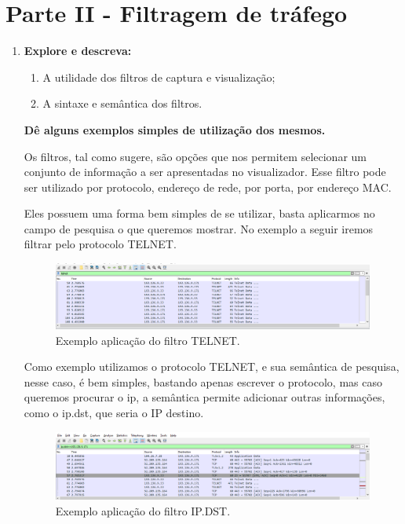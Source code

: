 \documentclass{llncs}
\begin{document}
  \section{Parte II - Filtragem de tráfego}

  \begin{enumerate}[\textbf{a)}]
    \item \textbf{Explore e descreva:}
    \begin{enumerate}[i]
      \item A utilidade dos filtros de captura e visualização;    
      \item A sintaxe e semântica dos filtros.
    \end{enumerate}
    \par\textbf{Dê alguns exemplos simples de utilização dos mesmos.}
    
    \begin{flushleft}
      \par Os filtros, tal como sugere, são opções que nos permitem selecionar um conjunto de informação a ser apresentadas no visualizador. Esse filtro pode ser utilizado por protocolo, endereço de rede, por porta, por endereço MAC.
      \par Eles possuem uma forma bem simples de se utilizar, basta aplicarmos no campo de pesquisa o que queremos mostrar. No exemplo a seguir iremos filtrar pelo protocolo TELNET.
      \begin{figure}[h]
        \includegraphics[scale=0.3]{filter01.png}
        \centering
        \caption{Exemplo aplicação do filtro TELNET.}
        \label{fig:filter01}
      \end{figure}
    \end{flushleft}
    
    \begin{flushleft}
      \par Como exemplo utilizamos o protocolo TELNET, e sua semântica de pesquisa, nesse caso, é bem simples, bastando apenas escrever o protocolo, mas caso queremos procurar o ip, a semântica permite adicionar outras informações, como o ip.dst, que seria o IP destino. 
      \begin{figure}[h]
        \includegraphics[scale=0.3]{filter02-dst.png}
        \centering
        \caption{Exemplo aplicação do filtro IP.DST.}
        \label{fig:filter02}
      \end{figure}
    \end{flushleft}


\end{enumerate}
\end{document}
